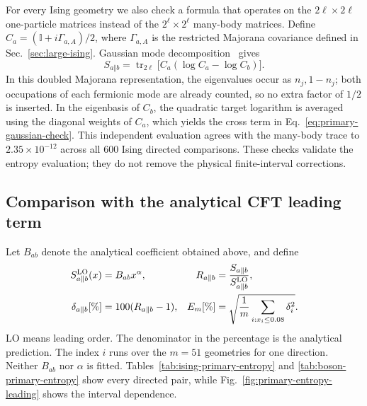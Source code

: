 For every Ising geometry we also check a formula that operates on the
$2\ell\times2\ell$ one-particle matrices instead of the
$2^\ell\times2^\ell$ many-body matrices. Define
$C_a=(\mathbb I+i\Gamma_{a,A})/2$, where $\Gamma_{a,A}$ is the
restricted Majorana covariance defined in Sec.~\ref{sec:large-ising}.
Gaussian mode decomposition~\cite{PeschelEisler} gives
\begin{equation}
 S_{a\Vert b}=\operatorname{tr}_{2\ell}
 \bigl[C_a(\log C_a-\log C_b)\bigr].
 \label{eq:primary-gaussian-check}
\end{equation}
In this doubled Majorana representation, the eigenvalues occur as
$n_j,1-n_j$; both occupations of each fermionic mode are already counted,
so no extra factor of $1/2$ is inserted. In the eigenbasis of $C_b$,
the quadratic target logarithm is averaged using the diagonal weights
of $C_a$, which yields the cross term in
Eq.~\eqref{eq:primary-gaussian-check}. This independent evaluation
agrees with the many-body trace to $2.35\times10^{-12}$ across all
600 Ising directed comparisons. These checks validate the entropy
evaluation; they do not remove the physical finite-interval corrections.

\subsection{Comparison with the analytical CFT leading term}
\label{sec:primary-results}
Let $B_{ab}$ denote the analytical coefficient obtained above, and define
\begin{align}
 S^{\rm LO}_{a\Vert b}(x)&=B_{ab}x^\alpha,
 &R_{a\Vert b}&=\frac{S_{a\Vert b}}{S^{\rm LO}_{a\Vert b}},\notag\\
 \delta_{a\Vert b}[\%]&=100(R_{a\Vert b}-1),
 &E_m[\%]&=\sqrt{\frac1m\sum_{i:x_i\leq0.08}\delta_i^2}.
 \label{eq:primary-comparison-metrics}
\end{align}
LO means leading order. The denominator in the percentage is the
analytical prediction. The index $i$ runs over the $m=51$ geometries for
one direction. Neither $B_{ab}$ nor $\alpha$ is fitted.
Tables~\ref{tab:ising-primary-entropy} and
\ref{tab:boson-primary-entropy} show every directed pair, while
Fig.~\ref{fig:primary-entropy-leading} shows the interval dependence.

